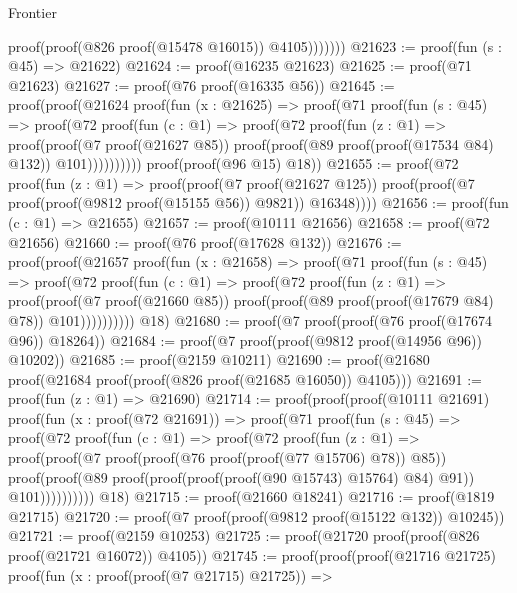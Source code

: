 \begin{lexlean}{Frontier}
\begin{coremodule}
                      proof(proof(@826 proof(@15478 @16015)) @4105)))))))
@21623 := proof(fun (s : @45) => @21622)
@21624 := proof(@16235 @21623)
@21625 := proof(@71 @21623)
@21627 := proof(@76 proof(@16335 @56))
@21645 := proof(proof(@21624
        proof(fun (x : @21625) =>
          proof(@71
              proof(fun (s : @45) =>
                proof(@72
                    proof(fun (c : @1) =>
                      proof(@72
                          proof(fun (z : @1) =>
                            proof(proof(@7 proof(@21627 @85))
                                proof(proof(@89 proof(proof(@17534 @84) @132)) @101))))))))))
      proof(proof(@96 @15) @18))
@21655 := proof(@72
      proof(fun (z : @1) =>
        proof(proof(@7 proof(@21627 @125))
            proof(proof(@7 proof(proof(@9812 proof(@15155 @56)) @9821)) @16348))))
@21656 := proof(fun (c : @1) => @21655)
@21657 := proof(@10111 @21656)
@21658 := proof(@72 @21656)
@21660 := proof(@76 proof(@17628 @132))
@21676 := proof(proof(@21657
        proof(fun (x : @21658) =>
          proof(@71
              proof(fun (s : @45) =>
                proof(@72
                    proof(fun (c : @1) =>
                      proof(@72
                          proof(fun (z : @1) =>
                            proof(proof(@7 proof(@21660 @85))
                                proof(proof(@89 proof(proof(@17679 @84) @78)) @101))))))))))
      @18)
@21680 := proof(@7 proof(proof(@76 proof(@17674 @96)) @18264))
@21684 := proof(@7 proof(proof(@9812 proof(@14956 @96)) @10202))
@21685 := proof(@2159 @10211)
@21690 := proof(@21680 proof(@21684 proof(proof(@826 proof(@21685 @16050)) @4105)))
@21691 := proof(fun (z : @1) => @21690)
@21714 := proof(proof(proof(@10111 @21691)
        proof(fun (x : proof(@72 @21691)) =>
          proof(@71
              proof(fun (s : @45) =>
                proof(@72
                    proof(fun (c : @1) =>
                      proof(@72
                          proof(fun (z : @1) =>
                            proof(proof(@7 proof(proof(@76 proof(proof(@77 @15706) @78)) @85))
                                proof(proof(@89
                                      proof(proof(proof(proof(@90 @15743) @15764) @84) @91))
                                    @101))))))))))
      @18)
@21715 := proof(@21660 @18241)
@21716 := proof(@1819 @21715)
@21720 := proof(@7 proof(proof(@9812 proof(@15122 @132)) @10245))
@21721 := proof(@2159 @10253)
@21725 := proof(@21720 proof(proof(@826 proof(@21721 @16072)) @4105))
@21745 := proof(proof(proof(@21716 @21725)
        proof(fun (x : proof(proof(@7 @21715) @21725)) =>

\end{coremodule}
\end{lexlean}
